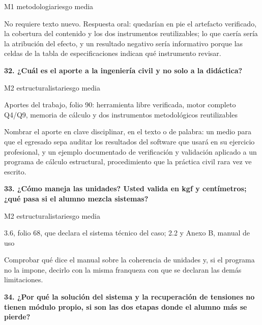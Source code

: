 {\small\color{gris}\sffamily M1 metodologia\quad{}\quad riesgo media}\par
{\small{}No requiere texto nuevo. Respuesta oral: quedarían en pie el artefacto verificado, la cobertura del contenido y los dos instrumentos reutilizables; lo que caería sería la atribución del efecto, y un resultado negativo sería informativo porque las celdas de la tabla de especificaciones indican qué instrumento revisar.\par}
\vspace{5pt}
\noindent\casilla\textbf{32. ¿Cuál es el aporte a la ingeniería civil y no solo a la didáctica?}\par
{\small\color{gris}\sffamily M2 estructuralista\quad{}\quad riesgo media}\par
{\small{}Aportes del trabajo, folio 90: herramienta libre verificada, motor completo Q4/\allowbreak{}Q9, memoria de cálculo y dos instrumentos metodológicos reutilizables\par}
{\small{}Nombrar el aporte en clave disciplinar, en el texto o de palabra: un medio para que el egresado sepa auditar los resultados del software que usará en su ejercicio profesional, y un ejemplo documentado de verificación y validación aplicado a un programa de cálculo estructural, procedimiento que la práctica civil rara vez ve escrito.\par}
\vspace{5pt}
\noindent\casilla\textbf{33. ¿Cómo maneja las unidades? Usted valida en kgf y centímetros; ¿qué pasa si el alumno mezcla sistemas?}\par
{\small\color{gris}\sffamily M2 estructuralista\quad{}\quad riesgo media}\par
{\small{}3.6, folio 68, que declara el sistema técnico del caso; 2.2 y Anexo B, manual de uso\par}
{\small{}Comprobar qué dice el manual sobre la coherencia de unidades y, si el programa no la impone, decirlo con la misma franqueza con que se declaran las demás limitaciones.\par}
\vspace{5pt}
\noindent\casilla\textbf{34. ¿Por qué la solución del sistema y la recuperación de tensiones no tienen módulo propio, si son las dos etapas donde el alumno más se pierde?}\par

